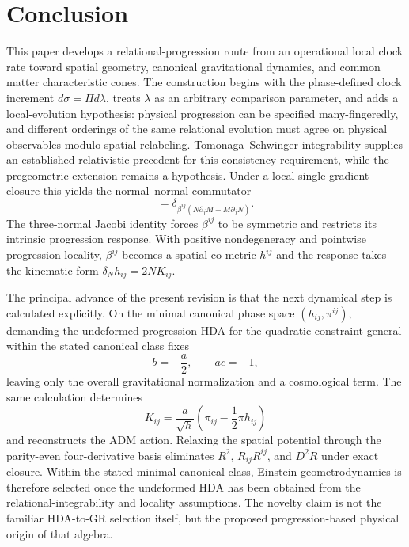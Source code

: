 \documentclass[11pt]{article}
\begin{document}
\section{Conclusion}

This paper develops a relational-progression route from an operational local clock rate toward spatial geometry, canonical gravitational dynamics, and common matter characteristic cones. The construction begins with the phase-defined clock increment $d\sigma=\Pi d\lambda$, treats $\lambda$ as an arbitrary comparison parameter, and adds a local-evolution hypothesis: physical progression can be specified many-fingeredly, and different orderings of the same relational evolution must agree on physical observables modulo spatial relabeling. Tomonaga--Schwinger integrability supplies an established relativistic precedent for this consistency requirement, while the pregeometric extension remains a hypothesis. Under a local single-gradient closure this yields the normal--normal commutator
\begin{equation}
    [\delta_N,\delta_M]
    =\delta_{\beta^{ij}(N\partial_jM-M\partial_jN)}.
\end{equation}
The three-normal Jacobi identity forces $\beta^{ij}$ to be symmetric and restricts its intrinsic progression response. With positive nondegeneracy and pointwise progression locality, $\beta^{ij}$ becomes a spatial co-metric $h^{ij}$ and the response takes the kinematic form $\delta_Nh_{ij}=2NK_{ij}$.

The principal advance of the present revision is that the next dynamical step is calculated explicitly. On the minimal canonical phase space $(h_{ij},\pi^{ij})$, demanding the undeformed progression HDA for the quadratic constraint general within the stated canonical class fixes
\begin{equation}
    b=-\frac a2,
    \qquad ac=-1,
\end{equation}
leaving only the overall gravitational normalization and a cosmological term. The same calculation determines
\begin{equation}
    K_{ij}=\frac{a}{\sqrt h}
    \left(\pi_{ij}-\frac12\pi h_{ij}\right)
\end{equation}
and reconstructs the ADM action. Relaxing the spatial potential through the parity-even four-derivative basis eliminates $R^2$, $R_{ij}R^{ij}$, and $D^2R$ under exact closure. Within the stated minimal canonical class, Einstein geometrodynamics is therefore selected once the undeformed HDA has been obtained from the relational-integrability and locality assumptions. The novelty claim is not the familiar HDA-to-GR selection itself, but the proposed progression-based physical origin of that algebra.
\end{document}

